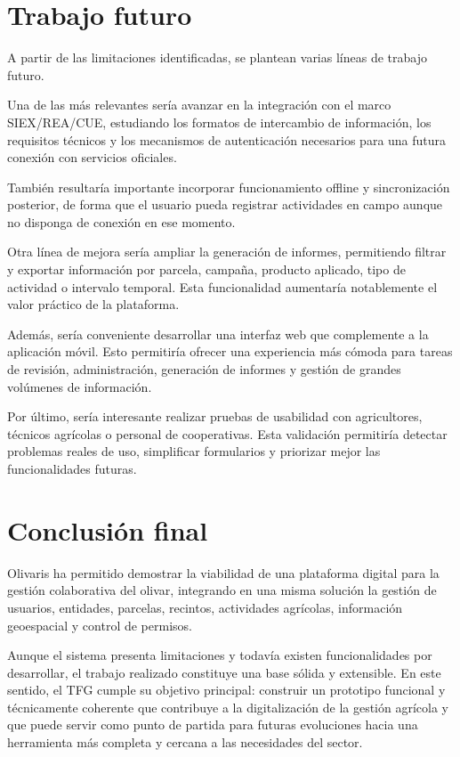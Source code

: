 \section{Trabajo futuro}

A partir de las limitaciones identificadas, se plantean varias líneas de trabajo futuro.

Una de las más relevantes sería avanzar en la integración con el marco SIEX/REA/CUE, estudiando los formatos de intercambio de información, los requisitos técnicos y los mecanismos de autenticación necesarios 
para una futura conexión con servicios oficiales.

También resultaría importante incorporar funcionamiento offline y sincronización posterior, de forma que el usuario pueda registrar actividades en campo aunque no disponga de conexión en ese momento.

Otra línea de mejora sería ampliar la generación de informes, permitiendo filtrar y exportar información por parcela, campaña, producto aplicado, tipo de actividad o intervalo temporal. Esta funcionalidad aumentaría 
notablemente el valor práctico de la plataforma.

Además, sería conveniente desarrollar una interfaz web que complemente a la aplicación móvil. Esto permitiría ofrecer una experiencia más cómoda para tareas de revisión, administración, generación de informes y gestión 
de grandes volúmenes de información.

Por último, sería interesante realizar pruebas de usabilidad con agricultores, técnicos agrícolas o personal de cooperativas. Esta validación permitiría detectar problemas reales de uso, simplificar formularios y priorizar 
mejor las funcionalidades futuras.

\section{Conclusión final}

Olivaris ha permitido demostrar la viabilidad de una plataforma digital para la gestión colaborativa del olivar, integrando en una misma solución la gestión de usuarios, entidades, parcelas, recintos, actividades agrícolas, 
información geoespacial y control de permisos.

Aunque el sistema presenta limitaciones y todavía existen funcionalidades por desarrollar, el trabajo realizado constituye una base sólida y extensible. En este sentido, el TFG cumple su objetivo principal: construir un prototipo 
funcional y técnicamente coherente que contribuye a la digitalización de la gestión agrícola y que puede servir como punto de partida para futuras evoluciones hacia una herramienta más completa y cercana a las necesidades del sector.
